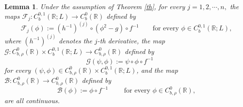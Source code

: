 \documentclass[11pt,reqno,a4paper]{amsart}
\newtheorem{lemma}{Lemma}
\numberwithin{equation}{section}
\begin{document}
\begin{lemma} \label{coninuous of fg}
Under the assumption of Theorem \ref{th}, for every $j=1,2,\cdots,n,$ the maps $\mathcal{F}_j:  C^{0,1}_b(\mathbb{R};L) \to C^0_b(\mathbb{R})$ defined by \[\mathcal{F}_j(\phi):=(h^{-1})^{(j)}\circ (\phi^{2} -g )\circ f^{-1} \qquad \text{for every } \phi\in C^{0,1}_b(\mathbb{R};L),  \]
where $(h^{-1})^{(j)}$ denotes the $j$-th derivative, the map $\mathcal{G}: C^0_{b,\rho }(\mathbb{R})  \times C^{0,1}_b(\mathbb{R};L) \to  C^0_{b,\rho }(\mathbb{R})$ defined by 
\[\mathcal{G} (\psi,\phi):= \psi \circ \phi \circ f^{-1} \qquad  \]
for every $(\psi,\phi) \in C^0_{b,\rho }(\mathbb{R})\times C^{0,1}_b(\mathbb{R};L)$, and the map $\mathcal{B}:  C^0_{b,\rho }(\mathbb{R}) \to  C^0_{b,\rho }(\mathbb{R})$ defined by
$$ \mathcal{B}(\phi) := \phi \circ f^{-1} \qquad\text{ for every } \phi \in C_{b,\rho}^{0}(\mathbb{R}), $$
are all continuous.

\end{lemma}
\end{document}
